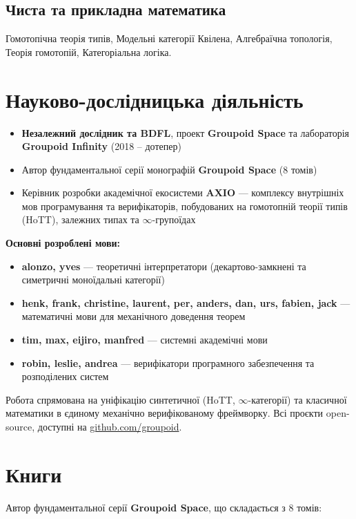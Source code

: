 \documentclass{article}
\begin{document}
\subsection{Чиста та прикладна математика}
Гомотопічна теорія типів, Модельні категорії Квілена, Алгебраїчна топологія, Теорія гомотопій, Категоріальна логіка.

\section{Науково-дослідницька діяльність}
\begin{itemize}[leftmargin=*]
    \item \textbf{Незалежний дослідник та BDFL}, проект \textbf{Groupoid Space} та лабораторія \textbf{Groupoid Infinity} (2018 -- дотепер)
    \item Автор фундаментальної серії монографій \textbf{Groupoid Space} (8 томів)
    \item Керівник розробки академічної екосистеми \textbf{AXIO} — комплексу внутрішніх мов програмування та верифікаторів, побудованих на гомотопній теорії типів (HoTT), залежних типах та $\infty$-групоїдах
\end{itemize}

\textbf{Основні розроблені мови:}

\begin{itemize}[leftmargin=*]
    \item \textbf{alonzo, yves} — теоретичні інтерпретатори (декартово-замкнені та симетричні моноїдальні категорії)
    \item \textbf{henk, frank, christine, laurent, per, anders, dan, urs, fabien, jack} — математичні мови для механічного доведення теорем
    \item \textbf{tim, max, eijiro, manfred} — системні академічні мови
    \item \textbf{robin, leslie, andrea} — верифікатори програмного забезпечення та розподілених систем
\end{itemize}

Робота спрямована на уніфікацію синтетичної (HoTT, $\infty$-категорії) та класичної математики в єдиному механічно верифікованому фреймворку. Всі проєкти open-source, доступні на \href{https://github.com/groupoid}{github.com/groupoid}.

\section{Книги}
Автор фундаментальної серії \textbf{Groupoid Space}, що складається з 8 томів:
\end{document}
